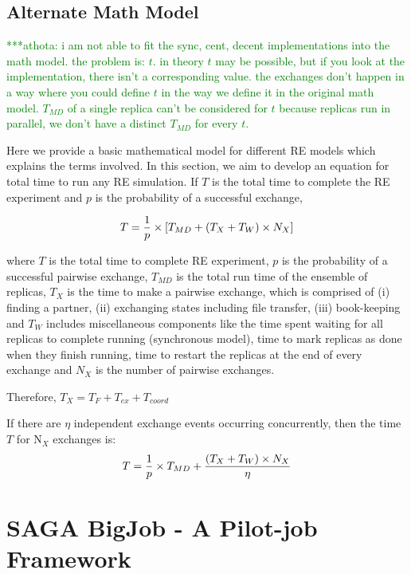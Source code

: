 \documentclass{rspublic}
\newcommand{\athotanote}[1]{ {\textcolor{green} { ***athota: #1 }}}
\newcommand{\athotanote}[1]{}
\begin{document}

\subsection{Alternate Math Model}
\athotanote{i am not able to fit the sync, cent, decent implementations into the math model. the problem is: $t$. in theory $t$ may be possible, but if you look at the implementation, there isn't a corresponding value. the exchanges don't happen in a way where you could define $t$ in the way we define it in the original math model. $T_{MD}$ of a single replica can't be considered for $t$ because replicas run in parallel, we don't have a distinct $T_{MD}$ for every $t$. }

Here we provide a basic mathematical model for different RE
models which explains the terms involved. In this section, we aim to
develop an equation for total time to run any RE simulation. If $T$ is
the total time to complete the RE experiment and $p$ is the
probability of a successful exchange,

\begin{eqnarray}
T = {1\over p} \times [T_{MD}+ (T_{X} + T_{W}) \times N_X]
\label{eq:totaltime}
\end{eqnarray}

where $T$ is the total time to complete RE experiment, $p$ is the probability of a successful pairwise exchange, $T_{MD}$ is the total run time of the ensemble of replicas, $T_{X}$ is the time to make a pairwise exchange, which is comprised of (i) finding a partner, (ii) exchanging
states including file transfer, (iii) book-keeping and $T_{W}$ includes miscellaneous components like the time spent waiting for all replicas to complete running (synchronous model), time to mark replicas as done when they finish running, time to restart the replicas at the end of every exchange and $N_X$ is the number of pairwise exchanges.

Therefore, ${T_{X}} = {T_F + T_{ex} + T_{coord}}$ 

If there are $\eta$ independent exchange events occurring concurrently, then the time $T$ for 
N$_X$ exchanges is:
\begin{eqnarray}
T = {1\over p} \times T_{MD}+ {(T_{X} + T_{W}) \times N_X\over \eta}
\label{eq:totaltime}
\end{eqnarray}


\section{SAGA BigJob - A Pilot-job Framework}
\label{sec:BigJob}
\end{document}
